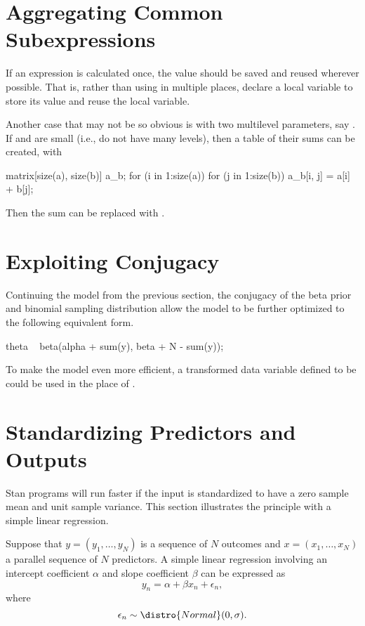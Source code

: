 \section{Aggregating Common Subexpressions}

If an expression is calculated once, the value should be saved and
reused wherever possible.  That is, rather than using
 in multiple places, declare a local variable to
store its value and reuse the local variable.  

Another case that may not be so obvious is with two multilevel
parameters, say .  If  and 
are small (i.e., do not have many levels), then a table  of
their sums can be created, with
%
\begin{stancode}
matrix[size(a), size(b)] a_b;
for (i in 1:size(a))
  for (j in 1:size(b))
    a_b[i, j] = a[i] + b[j];
\end{stancode}
%
Then the sum can be replaced with .


\section{Exploiting Conjugacy}


Continuing the model from the previous section, the conjugacy of the
beta prior and binomial sampling distribution allow the model to be
further optimized to the following equivalent form.
%
\begin{stancode}
    theta ~ beta(alpha + sum(y), beta + N - sum(y));
\end{stancode}
%
To make the model even more efficient, a transformed data variable
defined to be  could be used in the place of .

\section{Standardizing Predictors and Outputs}

Stan programs will run faster if the input is standardized to have a
zero sample mean and unit sample variance.  This section illustrates
the principle with a simple linear regression.

Suppose that $y = (y_1,\ldots,y_N)$ is a sequence of $N$ outcomes and
$x = (x_1,\ldots,x_N)$ a parallel sequence of $N$ predictors.  A
simple linear regression involving an intercept coefficient $\alpha$
and slope coefficient $\beta$ can be expressed as
\[
y_n = \alpha + \beta x_n + \epsilon_n,
\]
where
\[
\epsilon_n \sim \distro{Normal}(0,\sigma).
\]

